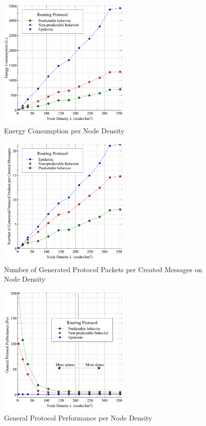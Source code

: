 \begin{figure}[!t]
	\centering
	\includegraphics[width=2.5in]{Graphs/EnergyConsumption.pdf}
	\caption{Energy Consumption per Node Density}
	\label{Energy Consumption per Node Density}
\end{figure}

\begin{figure}[!t]
	\centering
	\includegraphics[width=2.5in]{Graphs/messages.pdf}
	\caption{Number of Generated Protocol Packets per Created Messages on Node Density}
	\label{Number of Generated Protocol Packets}
\end{figure}

\begin{figure}[!t]
\centering
\includegraphics[width=2.5in]{Graphs/ProtocolPerformance.pdf}
\caption{General Protocol Performance per Node Density}
\label{General Protocol Performance per Node Density}
\end{figure}


